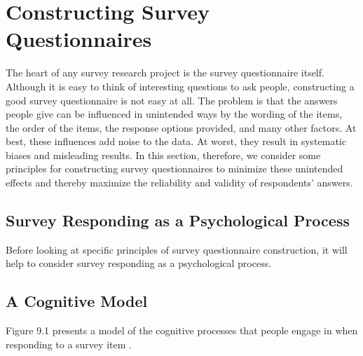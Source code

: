 \newpage
\section{Constructing Survey Questionnaires}


The heart of any survey research project is the survey questionnaire itself. Although it is easy to think of interesting questions to ask people, constructing a good survey questionnaire is not easy at all. The problem is that the answers people give can be influenced in unintended ways by the wording of the items, the order of the items, the response options provided, and many other factors. At best, these influences add noise to the data. At worst, they result in systematic biases and misleading results. In this section, therefore, we consider some principles for constructing survey questionnaires to minimize these unintended effects and thereby maximize the reliability and validity of respondents’ answers.

\subsection{Survey Responding as a Psychological Process}

Before looking at specific principles of survey questionnaire construction, it will help to consider survey responding as a psychological process.

\subsection{A Cognitive Model}

Figure 9.1 presents a model of the cognitive processes that people engage in when responding to a survey item \citep{sudman_thinking_1996}. 


